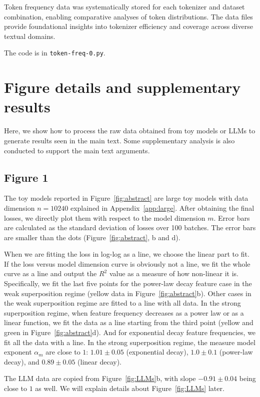 \documentclass{article}
\begin{document}
Token frequency data was systematically stored for each tokenizer and dataset combination, enabling comparative analyses of token distributions. The data files provide foundational insights into tokenizer efficiency and coverage across diverse textual domains.

The code is in \texttt{token-freq-0.py}.

\section{Figure details and supplementary results}

Here, we show how to process the raw data obtained from toy models or LLMs to generate results seen in the main text. Some supplementary analysis is also conducted to support the main text arguments.


\subsection{Figure 1}\label{app:fig1}

The toy models reported in Figure~\ref{fig:abstract} are large toy models with data dimension $n = 10240$ explained in Appendix~\ref{app:large}. After obtaining the final losses, we directly plot them with respect to the model dimension $m$. Error bars are calculated as the standard deviation of losses over 100 batches. The error bars are smaller than the dots (Figure~\ref{fig:abstract}, b and d).

When we are fitting the loss in log-log as a line, we choose the linear part to fit. If the loss versus model dimension curve is obviously not a line, we fit the whole curve as a line and output the $R^2$ value as a measure of how non-linear it is. Specifically, we fit the last five points for the power-law decay feature case in the weak superposition regime (yellow data in Figure~\ref{fig:abstract}b). Other cases in the weak superposition regime are fitted to a line with all data. In the strong superposition regime, when feature frequency decreases as a power law or as a linear function, we fit the data as a line starting from the third point (yellow and green in Figure~\ref{fig:abstract}d). And for exponential decay feature frequencies, we fit all the data with a line. In the strong superposition regime, the measure model exponent $\alpha_m$ are close to $1$: $1.01\pm 0.05$ (exponential decay), $1.0\pm 0.1$ (power-law decay), and $0.89 \pm 0.05$ (linear decay).

The LLM data are copied from Figure~\ref{fig:LLMs}b, with slope $-0.91\pm0.04$ being close to $1$ as well. We will explain details about Figure~\ref{fig:LLMs} later.
\end{document}
